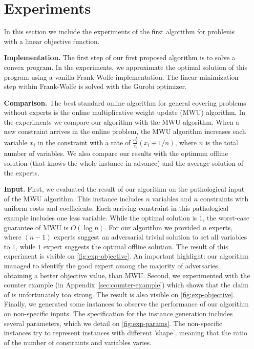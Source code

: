 
\section{Experiments} \label{sec:apx-exp}

In this section we include the experiments of the first algorithm for problems with a linear objective function.

\textbf{Implementation.} The first step of our first proposed algorithm is to solve a convex program. In the experiments, we approximate the optimal solution of this program using a vanilla Frank-Wolfe implementation. The linear minimization step within Frank-Wolfe is solved with the Gurobi optimizer.

\textbf{Comparison.} The best standard online algorithm for general covering problems without experts is the online multiplicative weight update (MWU) algorithm. In the experiments we compare our algorithm with the MWU algorithm. When a new constraint arrives in the online problem, the MWU algorithm increases each variable $x_i$ in the constraint with a rate of $\frac{a^t_i}{c_i}(x_i + 1/n)$, where $n$ is the total number of variables. We also compare our results with the optimum offline solution (that knows the whole instance in advance) and the average solution of the experts.

\textbf{Input.} First, we evaluated the result of our algorithm on the pathological input of the MWU algorithm. This instance includes $n$ variables and $n$ constraints with uniform costs and coefficients. Each arriving constraint in this pathological example includes one less variable. While the optimal solution is $1$, the worst-case guarantee of MWU is $O(\log n)$. For our algorithm we provided $n$ experts, where $(n-1)$ experts suggest an adversarial trivial solution to set all variables to $1$, while $1$ expert suggests the optimal offline solution. The result of this experiment is visible on \cref{fig:exp-objective}. An important highlight: our algorithm managed to identify the good expert among the majority of adversaries, obtaining a better objective value, than MWU. Second, we experimented with the counter example (in Appendix~\ref{sec:counter-example}) which shows that the claim of \cite{AnandGe22:Online-Algorithms} is unfortunately too strong. The result is also visible on \cref{fig:exp-objective}. Finally, we generated some instances to observe the performance of our algorithm on non-specific inputs.
The specification for the instance generation includes several parameters, which we detail on \cref{fig:exp-params}. The non-specific instances try to represent instances with different 'shape', meaning that the ratio of the number of constraints and variables varies.

